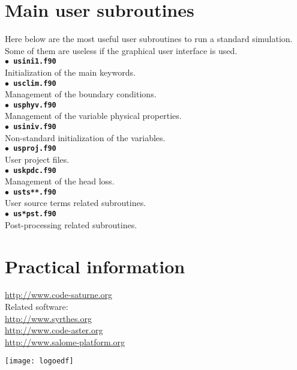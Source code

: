 \documentclass[a4paper,11pt]{article}
\newcommand{\refword}[1]{\texttt{$\bullet$ \bf{#1}}}
\begin{document}
\begin{multicols*}{3}

\section*{Main user subroutines}

Here below are the most useful user subroutines to run a standard
simulation. Some of them are useless if the graphical user interface
is used.\\

\refword{usini1.f90}\\
Initialization of the main keywords.\\

\refword{usclim.f90}\\
Management of the boundary conditions.\\

\refword{usphyv.f90}\\
Management of the variable physical properties.\\

\refword{usiniv.f90}\\
Non-standard initialization of the variables.\\

\refword{usproj.f90}\\
User project files.\\

\refword{uskpdc.f90}\\
Management of the head loss.\\

\refword{usts**.f90}\\
User source terms related subroutines.\\

\refword{us*pst.f90}\\
Post-processing related subroutines.\\




\section*{Practical information}

\url{http://www.code-saturne.org}\\

Related software:\\
\url{http://www.syrthes.org}\\
\url{http://www.code-aster.org}\\
\url{http://www.salome-platform.org}

\begin{center}
  \texttt{[image: logoedf]}
\end{center}

\end{multicols*}
\end{document}
